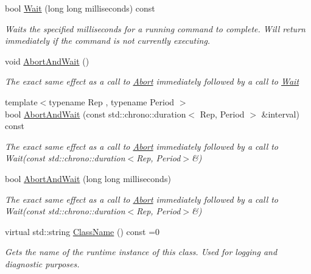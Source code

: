 \begin{DoxyCompactItemize}
bool \mbox{\hyperlink{class_command_lib_1_1_command_ad4cae3ab883426e4f872782b8de88597}{Wait}} (long long milliseconds) const
\begin{DoxyCompactList}\small\item\em Waits the specified milliseconds for a running command to complete. Will return immediately if the command is not currently executing. \end{DoxyCompactList}\item 
void \mbox{\hyperlink{class_command_lib_1_1_command_a6afa9e7eab83d5e59746fe15e295e066}{Abort\+And\+Wait}} ()
\begin{DoxyCompactList}\small\item\em The exact same effect as a call to \mbox{\hyperlink{class_command_lib_1_1_command_a247cbc7325e3b9d9d7044d449b989aa6}{Abort}} immediately followed by a call to \mbox{\hyperlink{class_command_lib_1_1_command_ac4d49fbf9bbcc543fb57e4b04edf1ddb}{Wait}} \end{DoxyCompactList}\item 
{\footnotesize template$<$typename Rep , typename Period $>$ }\\bool \mbox{\hyperlink{class_command_lib_1_1_command_af51df64ba29324bbbbe13c647e708563}{Abort\+And\+Wait}} (const std\+::chrono\+::duration$<$ Rep, Period $>$ \&interval) const
\begin{DoxyCompactList}\small\item\em The exact same effect as a call to \mbox{\hyperlink{class_command_lib_1_1_command_a247cbc7325e3b9d9d7044d449b989aa6}{Abort}} immediately followed by a call to Wait(const std\+::chrono\+::duration$<$\+Rep, Period$>$\&) \end{DoxyCompactList}\item 
bool \mbox{\hyperlink{class_command_lib_1_1_command_ab7e0fd4eb4f1d2b6d98228c1432805e3}{Abort\+And\+Wait}} (long long milliseconds)
\begin{DoxyCompactList}\small\item\em The exact same effect as a call to \mbox{\hyperlink{class_command_lib_1_1_command_a247cbc7325e3b9d9d7044d449b989aa6}{Abort}} immediately followed by a call to Wait(const std\+::chrono\+::duration$<$\+Rep, Period$>$\&) \end{DoxyCompactList}\item 
virtual std\+::string \mbox{\hyperlink{class_command_lib_1_1_command_a96f8ac531b436a41b21252fa2e17fd79}{Class\+Name}} () const =0
\begin{DoxyCompactList}\small\item\em Gets the name of the runtime instance of this class. Used for logging and diagnostic purposes. \end{DoxyCompactList}\item 

\end{DoxyCompactItemize}
